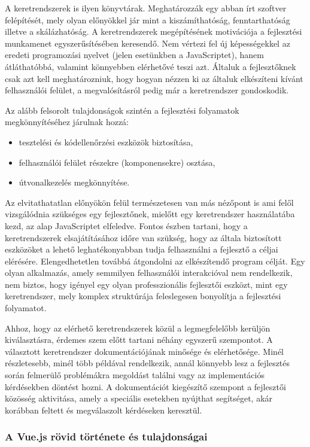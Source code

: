 \documentclass[12pt]{article}
\begin{document}
A keretrendszerek is ilyen könyvtárak. Meghatározzák egy abban írt szoftver felépítését, mely olyan előnyökkel jár mint a kiszámíthatóság, fenntarthatóság illetve a skálázhatóság.
A keretrendszerek megépítésének motivációja a fejlesztési munkamenet egyszerűsítésében keresendő. Nem vértezi fel új képességekkel az eredeti programozási nyelvet (jelen esetünkben a JavaScriptet), hanem átláthatóbbá, valamint könnyebben elérhetővé teszi azt. Általuk a fejlesztőknek csak azt kell meghatározniuk, hogy hogyan nézzen ki az általuk elkészíteni kívánt felhasználói felület, a megvalósításról pedig már a keretrendszer gondoskodik.

Az alább felsorolt tulajdonságok szintén a fejlesztési folyamatok megkönnyítéséhez járulnak hozzá:
\begin{itemize}
\item tesztelési és kódellenőrzési eszközök biztosítása,
\item felhasználói felület részekre (komponensekre) osztása,
\item útvonalkezelés megkönnyítése.
\end{itemize}

Az elvitathatatlan előnyökön felül természetesen van más nézőpont is ami felől vizsgálódnia szükséges egy fejlesztőnek, mielőtt egy keretrendszer használatába kezd, az alap JavaScriptet elfeledve. Fontos észben tartani, hogy a keretrendszerek elsajátításához időre van szükség, hogy az általa biztosított eszközöket a lehető leghatékonyabban tudja felhasználni a fejlesztő a céljai elérésére. Elengedhetetlen továbbá átgondolni az elkészítendő program célját. Egy olyan alkalmazás, amely semmilyen felhasználói interakcióval nem rendelkezik, nem biztos, hogy igényel egy olyan professzionális fejlesztői eszközt, mint egy keretrendszer, mely komplex struktúrája feleslegesen bonyolítja a fejlesztési folyamatot.

Ahhoz, hogy az elérhető keretrendszerek közül a legmegfelelőbb kerüljön kiválasztásra, érdemes szem előtt tartani néhány egyszerű szempontot. A választott keretrendszer dokumentációjának minősége és elérhetősége. Minél részletesebb, minél több példával rendelkezik, annál könnyebb lesz a fejlesztés során felmerülő problémákra megoldást találni vagy az implementációs kérdésekben döntést hozni. A dokumentációt kiegészítő szempont a fejlesztői közösség aktivitása, amely a speciális esetekben nyújthat segítséget, akár korábban feltett és megválaszolt kérdéseken keresztül.

\subsubsection{A Vue.js rövid története és tulajdonságai}
\end{document}
